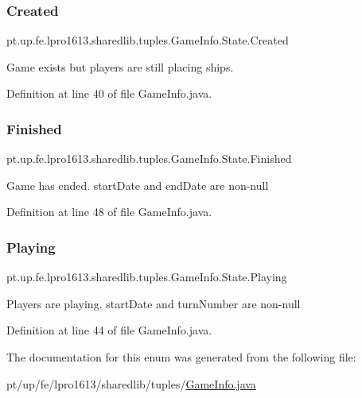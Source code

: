 \subsubsection{\texorpdfstring{Created}{Created}}
{\footnotesize\ttfamily pt.\+up.\+fe.\+lpro1613.\+sharedlib.\+tuples.\+Game\+Info.\+State.\+Created}

Game exists but players are still placing ships. 

Definition at line 40 of file Game\+Info.\+java.

\hypertarget{enumpt_1_1up_1_1fe_1_1lpro1613_1_1sharedlib_1_1tuples_1_1_game_info_1_1_state_a6027237a3e12ffc90ede63090e68cc98}{}\label{enumpt_1_1up_1_1fe_1_1lpro1613_1_1sharedlib_1_1tuples_1_1_game_info_1_1_state_a6027237a3e12ffc90ede63090e68cc98} 
\subsubsection{\texorpdfstring{Finished}{Finished}}
{\footnotesize\ttfamily pt.\+up.\+fe.\+lpro1613.\+sharedlib.\+tuples.\+Game\+Info.\+State.\+Finished}

Game has ended. start\+Date and end\+Date are non-\/null 

Definition at line 48 of file Game\+Info.\+java.

\hypertarget{enumpt_1_1up_1_1fe_1_1lpro1613_1_1sharedlib_1_1tuples_1_1_game_info_1_1_state_a91c1fe99e5b17a36fc9ba849d8e1be86}{}\label{enumpt_1_1up_1_1fe_1_1lpro1613_1_1sharedlib_1_1tuples_1_1_game_info_1_1_state_a91c1fe99e5b17a36fc9ba849d8e1be86} 
\subsubsection{\texorpdfstring{Playing}{Playing}}
{\footnotesize\ttfamily pt.\+up.\+fe.\+lpro1613.\+sharedlib.\+tuples.\+Game\+Info.\+State.\+Playing}

Players are playing. start\+Date and turn\+Number are non-\/null 

Definition at line 44 of file Game\+Info.\+java.



The documentation for this enum was generated from the following file\+:\begin{DoxyCompactItemize}
\item 
pt/up/fe/lpro1613/sharedlib/tuples/\hyperlink{_game_info_8java}{Game\+Info.\+java}\end{DoxyCompactItemize}
